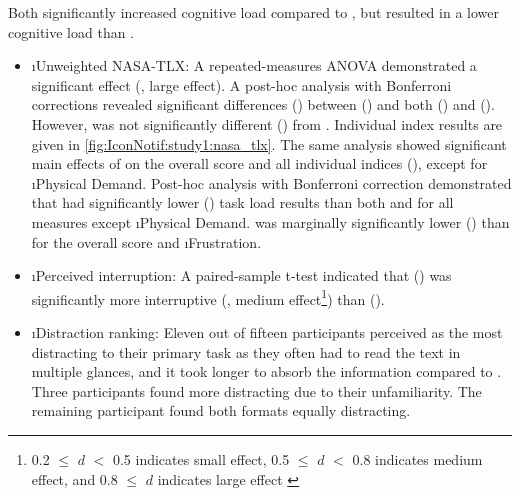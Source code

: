 Both  significantly increased cognitive load compared to \nonotif{}, but \iconnotif{} resulted in a lower cognitive load than \textnotif{}.

\begin{itemize}
    \item \i{Unweighted NASA-TLX}: A repeated-measures ANOVA demonstrated a significant effect (, large effect). A post-hoc analysis with Bonferroni corrections revealed significant differences () between \nonotif{} () and both \textnotif{} () and \iconnotif{} (). However, \textnotif{} was not significantly different () from \iconnotif{}. Individual index results are given in \autoref{fig:IconNotif:study1:nasa_tlx}. The same analysis showed significant main effects of \format{} on the overall score and all individual indices (), except for \i{Physical Demand}. Post-hoc analysis with Bonferroni correction demonstrated that \nonotif{} had significantly lower () task load results than both \textnotif{} and \iconnotif{} for all measures except \i{Physical Demand}. \iconnotif{} was marginally significantly lower () than \textnotif{} for the overall score and \i{Frustration}.
    
    \item \i{Perceived interruption}: A paired-sample t-test indicated that \textnotif{} () was significantly more interruptive (, medium effect\footnote{0.2 $\leq{}$ $d$ $<$ 0.5 indicates small effect, 0.5 $\leq{}$ $d$ $<$ 0.8 indicates medium effect, and 0.8 $\leq{}$ $d$ indicates large effect \cite{tomczak_need_2014, goss_sampson_statistical_2019}}) than \iconnotif{} ().
    
    \item \i{Distraction ranking}: Eleven out of fifteen participants perceived \textnotif{} as the most distracting to their primary task as they often had to read the text in multiple glances, and it took longer to absorb the information compared to \iconnotif{}. Three participants found  more distracting due to their unfamiliarity. The remaining participant found both formats equally distracting.
\end{itemize}


